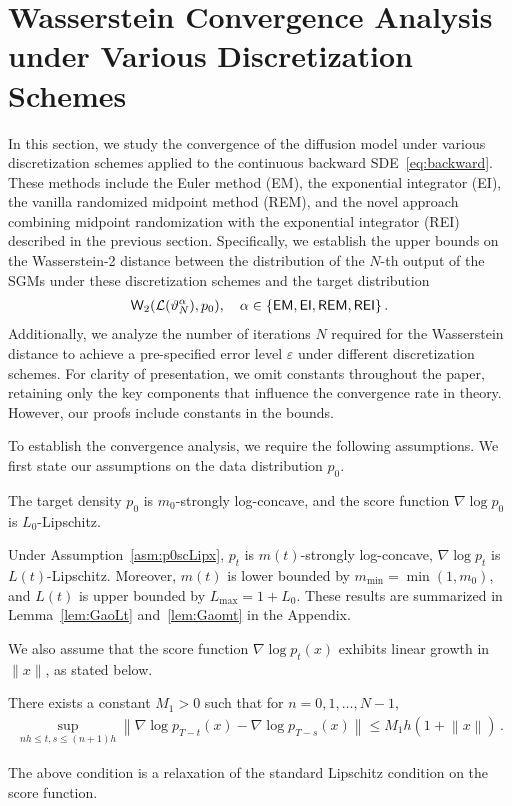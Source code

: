 \documentclass[11pt]{article}
\def\wass{{\sf W}}
\def\l|{\left\lVert}
\def\r|{\right\rVert}
\begin{document}
\section{Wasserstein Convergence Analysis under Various Discretization Schemes}
\label{sec:discretization}
In this section, we study the convergence of the diffusion model under various discretization schemes applied to the continuous backward SDE~\eqref{eq:backward}. These methods include the Euler method (EM), the exponential integrator (EI), the vanilla randomized midpoint method (REM), and the novel approach combining midpoint randomization with the exponential integrator (REI) described in the previous section.
Specifically, we establish the upper bounds on the Wasserstein-2 distance between the distribution of the $N$-th output of the SGMs under these discretization schemes and the target distribution
\begin{align*}
\wass_2(\mathcal{L}(\vartheta_N^{\alpha}),p_0), \quad \alpha\in\{\sf{EM,EI,REM,REI}\}\,.    
\end{align*}
Additionally, we analyze the number of iterations $N$ required for the Wasserstein distance to achieve a pre-specified error level $\varepsilon$ under different discretization schemes.
For clarity of presentation, we omit constants throughout the paper, retaining only the key components that influence the convergence rate in theory. However, our proofs include constants in the bounds.


To establish the convergence analysis, we require the following assumptions.
We first state our assumptions on the data distribution $p_0$.
\begin{assumption}
    \label{asm:p0scLipx}
    The target density $p_0$ is $m_0$-strongly log-concave, and the score function $\nabla\log p_0$ is $L_0$-Lipschitz. 
\end{assumption}
Under Assumption~\ref{asm:p0scLipx}, $p_t$ is $m(t)$-strongly log-concave, $\nabla\log p_t$ is $L(t)$-Lipschitz.
Moreover, $m(t)$ is lower bounded by $m_{\min}=\min(1,m_0)$, and $L(t)$ is upper bounded by $L_{\max}=1+L_0$.
These results are summarized in  Lemma~\ref{lem:GaoLt} and~\ref{lem:Gaomt} in the Appendix.

We also assume that the score function $\nabla\log p_t(x)$ exhibits linear growth in $\|x\|$, as stated below.
\begin{assumption}
    \label{asm:scLipt}
    There exists a constant $M_1>0$ such that for $n=0,1,\dots,N-1,$ 
    \begin{align*}
    \sup\limits_{nh\leqslant t,s\leqslant (n+1)h}
        \l|\nabla\log p_{T-t}(x)-\nabla\log p_{T-s}(x)\r|\leqslant M_1h(1+\l|x\r|)\,.
    \end{align*}
\end{assumption}
The above condition is a relaxation of the standard Lipschitz condition on the score function.
\end{document}
